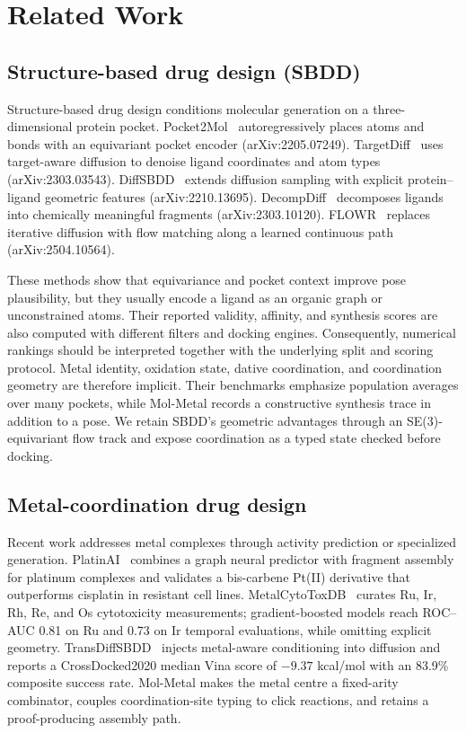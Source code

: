 \documentclass{article}
\begin{document}
\section{Related Work}

\subsection{Structure-based drug design (SBDD)}
Structure-based drug design conditions molecular generation on a three-dimensional protein pocket. Pocket2Mol~\cite{peng2022pocket2mol} autoregressively places atoms and bonds with an equivariant pocket encoder (arXiv:2205.07249). TargetDiff~\cite{lu2022targetdiff} uses target-aware diffusion to denoise ligand coordinates and atom types (arXiv:2303.03543). DiffSBDD~\cite{schneuing2023diffsbdd} extends diffusion sampling with explicit protein--ligand geometric features (arXiv:2210.13695). DecompDiff~\cite{guan2023diffcomp} decomposes ligands into chemically meaningful fragments (arXiv:2303.10120). FLOWR~\cite{zhang2025flowr} replaces iterative diffusion with flow matching along a learned continuous path (arXiv:2504.10564).

These methods show that equivariance and pocket context improve pose plausibility, but they usually encode a ligand as an organic graph or unconstrained atoms. Their reported validity, affinity, and synthesis scores are also computed with different filters and docking engines. Consequently, numerical rankings should be interpreted together with the underlying split and scoring protocol. Metal identity, oxidation state, dative coordination, and coordination geometry are therefore implicit. Their benchmarks emphasize population averages over many pockets, while Mol-Metal records a constructive synthesis trace in addition to a pose. We retain SBDD's geometric advantages through an SE(3)-equivariant flow track and expose coordination as a typed state checked before docking.

\subsection{Metal-coordination drug design}
Recent work addresses metal complexes through activity prediction or specialized generation. PlatinAI~\cite{rusanov2025platinai} combines a graph neural predictor with fragment assembly for platinum complexes and validates a bis-carbene Pt(II) derivative that outperforms cisplatin in resistant cell lines. MetalCytoToxDB~\cite{krasnov2026metalcytotoxdb} curates Ru, Ir, Rh, Re, and Os cytotoxicity measurements; gradient-boosted models reach ROC--AUC 0.81 on Ru and 0.73 on Ir temporal evaluations, while omitting explicit geometry. TransDiffSBDD~\cite{transdiff2025} injects metal-aware conditioning into diffusion and reports a CrossDocked2020 median Vina score of $-9.37$ kcal/mol with an 83.9\% composite success rate. Mol-Metal makes the metal centre a fixed-arity combinator, couples coordination-site typing to click reactions, and retains a proof-producing assembly path.
\end{document}
